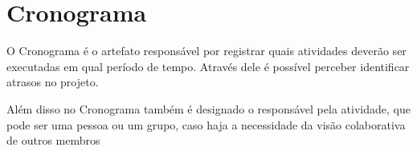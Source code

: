 \section{Cronograma}
O Cronograma é o artefato responsável por registrar quais atividades deverão ser executadas em qual período de tempo. Através dele é possível perceber identificar atrasos no projeto.

Além disso no Cronograma também é designado o responsável pela atividade, que pode ser uma pessoa ou um grupo, caso haja a necessidade da visão colaborativa de outros membros




